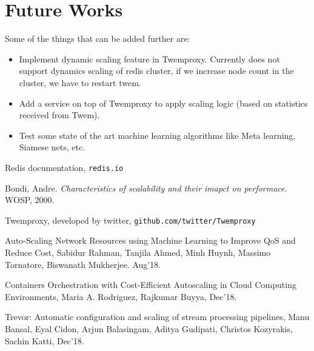 \documentclass[11pt]{article}
\begin{document}
\section*{Future Works}
Some of the things that can be added further are:
\begin{itemize}
    \item Implement dynamic scaling feature in Twemproxy. Currently does not support dynamics scaling of
        redis cluster, if we increase node count in the cluster, we have to restart twem.
    \item Add a service on top of Twemproxy to apply scaling logic (based
on statistics received from Twem).
    \item Test some state of the art machine learning algorithms like Meta
learning, Siamese nets, etc.
\end{itemize}

\pagebreak
\begin{thebibliography}{9}

Redis documentation,
\texttt{redis.io}
        
Bondi, Andre.
\textit{Characteristics of scalability and their imapct on performace.}
WOSP, 2000.

Twemproxy, developed by twitter,
\texttt{github.com/twitter/Twemproxy}

Auto-Scaling Network Resources using Machine Learning to Improve QoS and Reduce Cost,
Sabidur Rahman, Tanjila Ahmed, Minh Huynh, Massimo Tornatore, Biswanath Mukherjee.
Aug'18.

Containers Orchestration with Cost-Efficient Autoscaling in Cloud Computing Environments,
Maria A. Rodriguez, Rajkumar Buyya,
Dec'18.

Trevor: Automatic configuration and scaling of stream processing pipelines,
Manu Bansal, Eyal Cidon, Arjun Balasingam, Aditya Gudipati, Christos Kozyrakis, Sachin Katti,
Dec'18.

\end{thebibliography}
\end{document}
